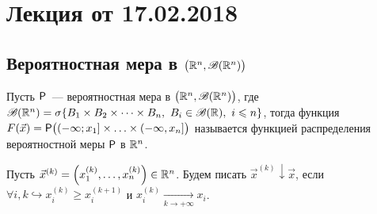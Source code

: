 \section{Лекция от 17.02.2018}
\subsection{Вероятностная мера в $\big( \R^n, \B(\R^n) \big)$}
\begin{definition}
	Пусть $\P$~--- вероятностная мера в $\big( \R^n, \B(\R^n) \big)$, где $\B(\R^n) = \sigma\{B_1 \times B_2 \times \dots \times B_n,\ B_i \in \B(\R),\ i \leqslant n \}$, тогда функция $F(\vec x) = \P\big((-\infty; x_1] \times \ldots \times (-\infty, x_n]\big)$ называется функцией распределения вероятностной меры $\P$ в $\R^n$.
\end{definition}

\begin{note}
	Пусть $\vec x^{(k)} = \left(x_1^{(k)}, \ldots, x_n^{(k)}\right) \in \R^n$. Будем писать $\vec x^{(k)} \downarrow \vec x$, если $\forall i, k \hookrightarrow x_i^{(k)} \geqslant x_i^{(k + 1)}$ и $x_i^{(k)} \underset{k \rightarrow +\infty}{\longrightarrow} x_i$.
\end{note}

